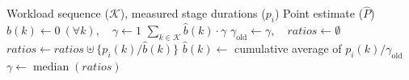 \begin{algorithm}[t]
\caption{Shared Duration Predictor}
\label{alg:shared-predictor}
\footnotesize
\renewcommand{\algorithmicrequire}{\textbf{Input:}}
\renewcommand{\algorithmicensure}{\textbf{Output:}}
\begin{algorithmic}[1]
\Require Workload sequence ($\mathcal K$), measured stage durations ($p_i$)
\Ensure Point estimate ($\hat P$)
\State $\hat b(k)\gets0\ (\forall k),\quad \gamma\gets1$ \label{alg:pe:init}
\State
{}
  \State \Return $\sum_{k\in\mathcal K}\hat b(k)\cdot\gamma$ \label{alg:pe:compute}
\EndFunction
\State
{}
  \State $\gamma_{\mathrm{old}}\gets\gamma,\quad \mathit{ratios}\gets\emptyset$ \label{alg:pe:snapshot}
   \label{alg:pe:loop}
     \label{alg:pe:observed}
      \State $\mathit{ratios}\gets\mathit{ratios}\uplus\{p_i(k)/\hat b(k)\}$ \label{alg:pe:ratio}
    \EndIf
    \State $\hat b(k)\gets$ cumulative average of $p_i(k)/\gamma_{\mathrm{old}}$ \label{alg:pe:base}
  \EndFor
   \label{alg:pe:condition}
    \State $\gamma\gets\operatorname{median}(\mathit{ratios})$ \label{alg:pe:gamma}
  \EndIf
\EndProcedure
\end{algorithmic}
\end{algorithm}
